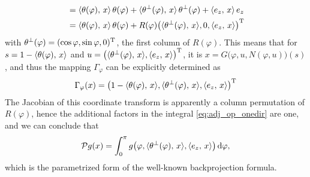 \documentclass{amsart}
\renewcommand*{\phi}{\varphi}
\begin{document}
\begin{example}
\begin{align*}
  &= \INNER{\theta(\phi)}{x}\, \theta(\phi) + \INNER{\theta^\perp(\phi)}{x}\, \theta^\perp(\phi) + \INNER{e_z}{x}\, e_z \\
  &= \INNER{\theta(\phi)}{x}\, \theta(\phi) + R(\phi) \TRANSP{\big(\INNER{\theta^\perp(\phi)}{x}, 0, \INNER{e_z}{x}\big)}
 \end{align*}
 with $\theta^\perp(\phi) = \TRANSP{(\cos\phi, \sin\phi, 0)}$, the first column of $R(\phi)$. This means that for 
 $s = 1 - \INNER{\theta(\phi)}{x}$ and $u = \TRANSP{\big(\INNER{\theta^\perp(\phi)}{x}, \INNER{e_z}{x}\big)}$, it is 
 $x = G\big(\phi, u, N(\phi, u)\big)(s)$, and thus the mapping $\Gamma_\phi$ can be explicitly determined as
 \begin{equation*}
  \Gamma_\phi(x) = \TRANSP{\big(1 - \INNER{\theta(\phi)}{x}, \INNER{\theta^\perp(\phi)}{x}, \INNER{e_z}{x}\big)}
 \end{equation*}
 The Jacobian of this coordinate transform is apparently a column permutation of $R(\phi)$, hence the additional factors in the integral 
 \eqref{eq:adj_op_onedir} are one, and we can conclude that
 \begin{equation*}
  \OPP g(x) = \int_0^\pi g\big(\phi, \INNER{\theta^\perp(\phi)}{x}, \INNER{e_z}{x}\big)\, \D\phi,
 \end{equation*}
 which is the parametrized form of the well-known backprojection formula.
\end{example}
%
%
%
\end{document}
